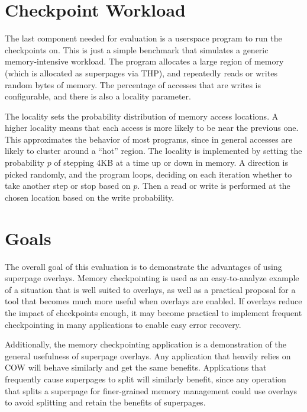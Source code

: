 \section{Checkpoint Workload}

The last component needed for evaluation is a userspace program to run the checkpoints on. This is just a simple benchmark that simulates a generic memory-intensive workload. The program allocates a large region of memory (which is allocated as superpages via THP), and repeatedly reads or writes random bytes of memory. The percentage of accesses that are writes is configurable, and there is also a locality parameter.

The locality sets the probability distribution of memory access locations. A higher locality means that each access is more likely to be near the previous one. This approximates the behavior of most programs, since in general accesses are likely to cluster around a ``hot'' region. The locality is implemented by setting the probability $p$ of stepping 4KB at a time up or down in memory. A direction is picked randomly, and the program loops, deciding on each iteration whether to take another step or stop based on $p$. Then a read or write is performed at the chosen location based on the write probability.

\section{Goals}

The overall goal of this evaluation is to demonstrate the advantages of using superpage overlays. Memory checkpointing is used as an easy-to-analyze example of a situation that is well suited to overlays, as well as a practical proposal for a tool that becomes much more useful when overlays are enabled. If overlays reduce the impact of checkpoints enough, it may become practical to implement frequent checkpointing in many applications to enable easy error recovery.

Additionally, the memory checkpointing application is a demonstration of the general usefulness of superpage overlays. Any application that heavily relies on COW will behave similarly and get the same benefits. Applications that frequently cause superpages to split will similarly benefit, since any operation that splits a superpage for finer-grained memory management could use overlays to avoid splitting and retain the benefits of superpages.
